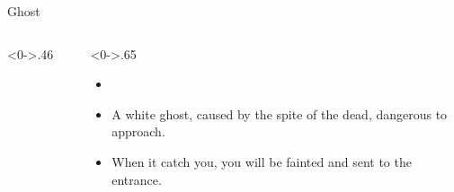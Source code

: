 \documentclass[notheorems]{beamer}
\begin{document}
\begin{framenl}{Ghost}
	\begin{columns}[T] %
		\begin{column}<0->{.46\textwidth}
			\begin{figure}[thpb]
				\centering
				\end{figure}
			\end{column}%
		\hfill%
		\begin{column}<0->{.65\textwidth}
			\begin{itemize}
				\item []
				\item<1-> A white ghost, caused by the spite of the dead, dangerous to approach.
				\item<2-> When it catch you, you will be fainted and sent to the entrance.
			
			\end{itemize}
		\end{column}%
	\end{columns}

\end{framenl}
\end{document}
